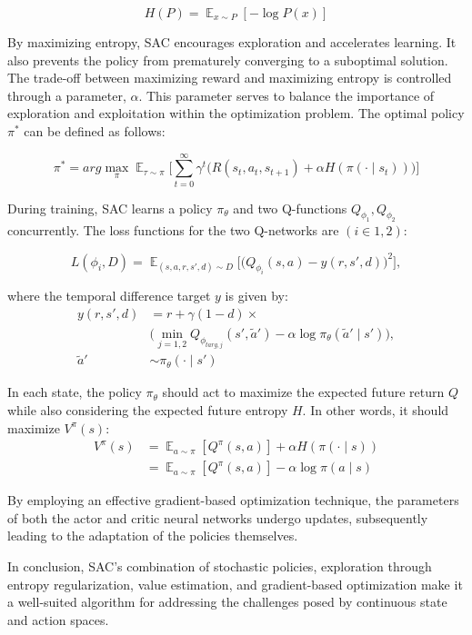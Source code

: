\[
 H(P) = \displaystyle \mathop{\mathbb{E}}_{x \sim P}[-\log P(x)]
\]

By maximizing entropy, SAC encourages exploration and accelerates learning. It
also prevents the policy from prematurely converging to a suboptimal solution.
The trade-off between maximizing reward and maximizing entropy is controlled
through a parameter, \(\alpha\). This parameter serves to balance the importance
of exploration and exploitation within the optimization problem. The optimal policy
\(\pi^*\) can be defined as follows:

\[
 \pi^* = {arg}{\max_{\pi}}{\displaystyle
 \mathop{\mathbb{E}}_{\tau\sim\pi}}{\Bigg[{\sum_{t=0}^{\infty}}{\gamma^{t}}{\Big(R(s_t,a_t,s_{t+1})}+{\alpha}H(\pi(\cdot\mid{s_t}))\Big)\Bigg]}
\]

During training, SAC learns a policy $\pi_{\theta}$ and two Q-functions
$Q_{\phi_1} , Q_{\phi_2}$ concurrently. The loss functions for the two Q-networks are
$(i \in {1, 2})$:

\[
  L(\phi_i,D) = \displaystyle
  \mathop{\mathbb{E}}_{(s,a,r,s',d)\sim{D}}\bigg[\bigg(Q_{\phi_i}(s,a)-y(r,s',d)\bigg)^2\bigg],
\]

where the temporal difference target \(y\) is given by:
\begin{align*}
  y(r,s',d) &= r + \gamma(1-d) \times \nonumber \\
  & \bigg(\displaystyle
  \mathop{\min}_{j=1,2}Q_{\phi_{targ,j}}(s',\tilde{a}')-\alpha\log
  {\pi_\theta}(\tilde{a}'\mid{s}')\bigg), \\
  \tilde{a}'&\sim{\pi_\theta}(\cdot\mid{s'})
\end{align*}

In each state, the policy \(\pi_\theta\) should act to maximize the expected
future return \(Q\) while also considering the expected future entropy \(H\). In other
words, it should maximize \(V^\pi(s)\):
\begin{align*}
 V^\pi(s) &= {\displaystyle \mathop{\mathbb{E}}_{a\sim\pi}[Q^\pi(s,a)]} +
 \alpha{H(\pi(\cdot\mid{s}))} \\
 &= {\displaystyle \mathop{\mathbb{E}}_{a\sim\pi}[Q^\pi(s,a)]} -
 \alpha{\log {\pi(a\mid{s})}}
\end{align*}


By employing an effective gradient-based optimization technique, the parameters
of both the actor and critic neural networks undergo updates, subsequently
leading to the adaptation of the policies themselves.

In conclusion, SAC's combination of stochastic policies, exploration through
entropy regularization, value estimation, and gradient-based optimization make
it a well-suited algorithm for addressing the challenges posed by continuous
state and action spaces.

